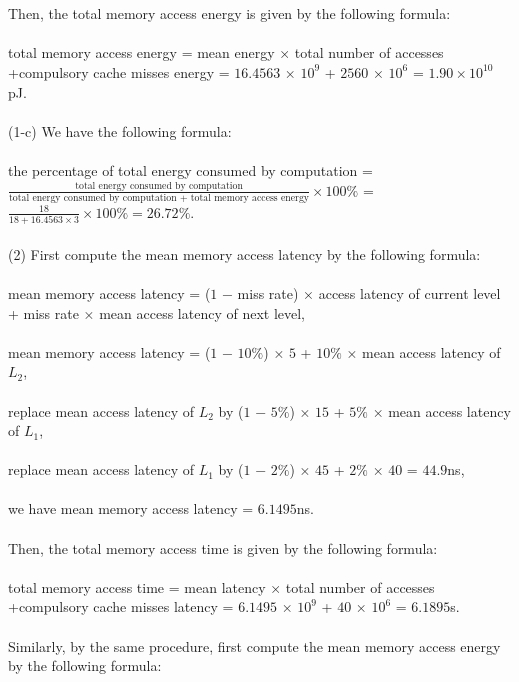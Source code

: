\documentclass[11pt]{article}
\begin{document}
\begin{solution}
\\
\\
Then, the total memory access energy is given by the following formula:
\\
\\
total memory access energy = mean energy × total number of accesses
+compulsory cache misses energy = $16.4563$ × $10^9$ + $2560$ × $10^6$ = $1.90\times10^{10}$pJ.
\\
\\
(1-c) We have the following formula:
\\
\\
the percentage of total energy consumed by computation = $\frac{\text{total energy consumed by computation}}{\text{total energy consumed by computation + total memory access energy}} \times 100\%$ = $\frac{18}{18 + 16.4563 \times 3} \times 100\% = 26.72\%$.
\\
\\
(2) First compute the mean memory access latency by the following formula:
\\
\\
mean memory access latency = ($1$ $-$ miss rate) × access latency of current level
+ miss rate × mean access latency of next level,
\\
\\
mean memory access latency = ($1$ $-$ $10\%$) × $5$ + $10\%$ × mean access latency of $L_2$,
\\
\\
replace mean access latency of $L_2$ by ($1$ $-$ $5\%$) × $15$ + $5\%$ × mean access latency of $L_1$,
\\
\\
replace mean access latency of $L_1$ by ($1$ $-$ $2\%$) × $45$ + $2\%$ × $40$ = $44.9$ns,
\\
\\
we have mean memory access latency = $6.1495$ns.
\\
\\
Then, the total memory access time is given by the following formula:
\\
\\
total memory access time = mean latency × total number of accesses
+compulsory cache misses latency = $6.1495$ × $10^9$ + $40$ × $10^6$ = $6.1895$s.
\\
\\
Similarly, by the same procedure, first compute the mean memory access energy by the following formula:
\\
\\

\end{solution}
\end{document}
